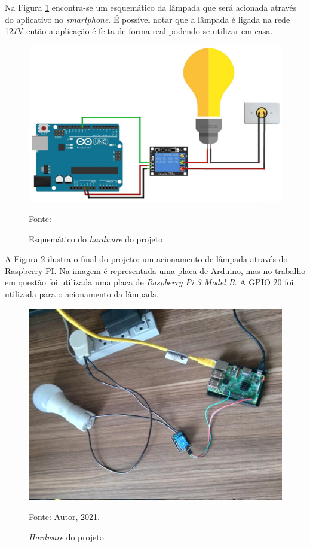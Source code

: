 \documentclass[
12pt,
openany, %
oneside, %
a4paper,			
english,			
brazil			        %
]{abntbibufjf}
\begin{document}
    Na Figura \ref{montagem} encontra-se um esquemático da lâmpada que será acionada através do aplicativo no \textit{smartphone}. É possível notar que a lâmpada é ligada na rede 127V então a aplicação é feita de forma real podendo se utilizar em casa.
    
    \begin{figure}[!htb]
		\centering
		\includegraphics[scale=0.3]{Figuras/esquematico.jpg}
		\caption{Esquemático do \textit{hardware} do projeto}
		\label{montagem}
		\par Fonte: \cite{ELETRONICA}
	\end{figure}
    
    A Figura \ref{montagemFinal} ilustra o final do projeto: um acionamento de lâmpada através do Raspberry PI. Na imagem é representada uma placa de Arduino, mas no trabalho em questão foi utilizada uma placa de \textit{Raspberry Pi 3 Model B}.
    A GPIO 20 foi utilizada para o acionamento da lâmpada.
    
    
    
    \begin{figure}[!htb]
		\centering
		\includegraphics[scale=0.4]{Figuras/montagemFisica.jpeg}
		\caption{\textit{Hardware} do projeto}
		\label{montagemFinal}
		\par Fonte: Autor, 2021.
	\end{figure}
	
\end{document}
